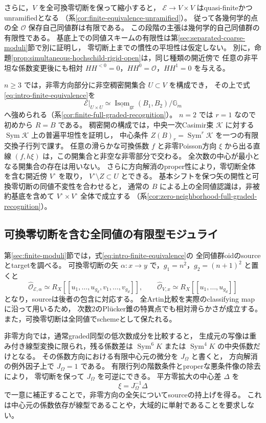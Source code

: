 \documentclass[a4paper,11pt]{ltjsarticle}
\numberwithin{equation}{section}
\theoremstyle{plain}
\theoremstyle{definition}
\theoremstyle{remark}
\newcommand{\Gm}{\mathbb G_m}
\begin{document}
さらに，$V$ を全可換零切断を保って縮小すると，
$\mathcal E\to V\times V$ はquasi-finiteかつunramifiedとなる
（系\ref{cor:finite-equivalence-unramified}）。
従って各幾何学的点の全 $\mathcal O$ 保存自己同値群は有限である。
この段階の主張は幾何学的自己同値群の有限性である。
基底上での同値スキームの有限性は第\ref{sec:separated-coarse-moduli}節で別に証明し，
零切断上までの慣性の平坦性は仮定しない。
別に，命題\ref{prop:simultaneous-hochschild-rigid-open}は，同じ種類の開近傍で
任意の非平坦な係数変更後にも相対 $HH^{<0}=0$，$HH^0=\mathcal O$，$HH^1=0$ を与える。

$n\ge3$ では，非零方向部分に非空稠密開集合 $U\subset V$ を構成でき，
その上で式\eqref{eq:intro-finite-equivalence}を
\[
 \mathcal E|_{U\times U}
 \simeq\underline{\operatorname{Isom}}_{\mathrm{gr}}(B_1,B_2)/\Gm
\]
へ強められる（系\ref{cor:finite-full-graded-recognition}）。
$n=2$ では $r=1$ なので初めから $R=B$ である。
稠密開の構成では，中央一次Casimir束 $\mathcal K$ に対する
$\operatorname{Sym}\mathcal K$ 上の普遍平坦性を証明し，
中心条件 $Z(B)_r=\operatorname{Sym}^r\mathcal K$ を一つの有限交換子行列で課す。
任意の滑らかな可換係数 $f$ と非零Poisson方向 $\xi$ から出る直線
$(f,h\xi)$ は，この開集合と非空な非零部分で交わる。
全次数の中心が最小となる開集合の存在は用いない。
さらに方向解消のproper性により，零切断全体を含む開近傍 $V^\circ$ を取り，
$V^\circ\setminus Z\subset U$ とできる。
基本シフトを保つ矢の開性と可換零切断の同値不変性を合わせると，
通常の $B$ による上の全同値認識は，非被約基底を含めて
$V^\circ\times V^\circ$ 全体で成立する
（系\ref{cor:zero-neighborhood-full-graded-recognition}）。

\subsection{可換零切断を含む全同値の有限型モジュライ}
第\ref{sec:finite-moduli}節では，式\eqref{eq:intro-finite-equivalence}の
全同値群oidのsourceとtargetを調べる。
可換零切断の矢 $\alpha:x\to y$ で，$g_1=n^2$，$g_2=(n+1)^2$ と置くと
\[
 \widehat{\mathcal O}_{\mathcal E,\alpha}
 \simeq R_X[[u_1,\ldots,u_{g_d},v_1,\ldots,v_{g_d}]],
 \qquad
 \widehat{\mathcal O}_{V,x}\simeq R_X[[u_1,\ldots,u_{g_d}]]
\]
となり，sourceは後者の包含に対応する。
全Artin比較を実際のclassifying mapに沿って用いるため，
次数2のPl\"ucker錐の特異点でも相対滑らかさが成立する。
また，可換零切断は全同値でschemeとして保たれる。

非零方向では，通常graded同型の低次数成分を比較すると，
生成元の写像は重み付き線型変換に限られ，残る係数差は
$\operatorname{Sym}^6K$ または $\operatorname{Sym}^4K$ の中央係数だけとなる。
その係数方向における有限中心元の微分を $J_\Omega$ と書くと，
方向解消の例外因子上で $J_\Omega=1$ である。
有限行列の階数条件とproperな悪条件像の除去により，
零切断を保って $J_\Omega$ を可逆にできる。
平方零拡大の中心差 $\Delta$ を
\[
                     \xi=J_\Omega^{-1}\Delta
\]
で一意に補正することで，非零方向の全矢についてsourceの持上げを得る。
これは中心元の係数依存が線型であることや，大域的に単射であることを要求しない。
\end{document}
